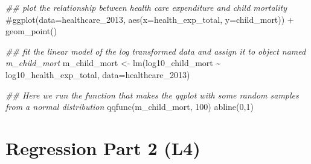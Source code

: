 \documentclass[
  letterpaper,
  8pt,
  a4paper]{book}
\newenvironment{Shaded}{\begin{snugshade}}{\end{snugshade}}
\newcommand{\AttributeTok}[1]{\textcolor[rgb]{0.40,0.45,0.13}{#1}}
\newcommand{\CommentTok}[1]{\textcolor[rgb]{0.37,0.37,0.37}{#1}}
\newcommand{\DecValTok}[1]{\textcolor[rgb]{0.68,0.00,0.00}{#1}}
\newcommand{\DocumentationTok}[1]{\textcolor[rgb]{0.37,0.37,0.37}{\textit{#1}}}
\newcommand{\FunctionTok}[1]{\textcolor[rgb]{0.28,0.35,0.67}{#1}}
\newcommand{\NormalTok}[1]{\textcolor[rgb]{0.00,0.23,0.31}{#1}}
\newcommand{\OtherTok}[1]{\textcolor[rgb]{0.00,0.23,0.31}{#1}}
\newcommand{\SpecialCharTok}[1]{\textcolor[rgb]{0.37,0.37,0.37}{#1}}
\begin{document}
\begin{Shaded}
\begin{Highlighting}[]
\DocumentationTok{\#\# plot the relationship between health care expenditure and child mortality}
\CommentTok{\#ggplot(data=healthcare\_2013, aes(x=health\_exp\_total, y=child\_mort)) + geom\_point()}

\DocumentationTok{\#\# fit the linear model of the log transformed data and assign it to object named m\_child\_mort}
\NormalTok{m\_child\_mort }\OtherTok{\textless{}{-}} \FunctionTok{lm}\NormalTok{(log10\_child\_mort }\SpecialCharTok{\textasciitilde{}}\NormalTok{ log10\_health\_exp\_total, }\AttributeTok{data=}\NormalTok{healthcare\_2013)}

\DocumentationTok{\#\# Here we run the function that makes the qqplot with some random samples from a normal distribution}
\FunctionTok{qqfunc}\NormalTok{(m\_child\_mort, }\DecValTok{100}\NormalTok{)}
\FunctionTok{abline}\NormalTok{(}\DecValTok{0}\NormalTok{,}\DecValTok{1}\NormalTok{)}
\end{Highlighting}
\end{Shaded}


\chapter*{Regression Part 2 (L4)}\label{regression-part-2-l4}

\end{document}
